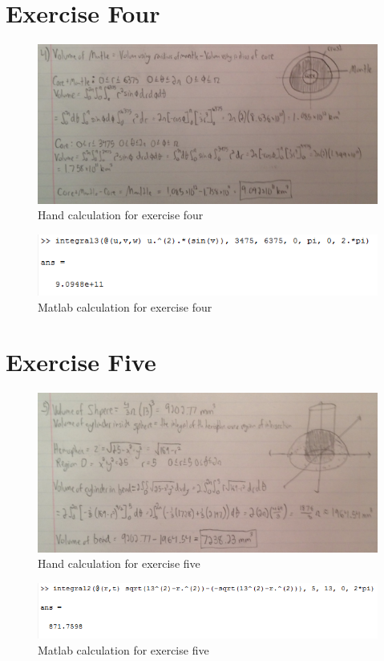 \documentclass[11pt]{article}
\begin{document}
\section*{Exercise Four}
\begin{figure}[H]
	\includegraphics[width=\textwidth]{Four_Hand}
	\caption{Hand calculation for exercise four}
\end{figure}
\begin{figure}[H]
	\includegraphics[width=\textwidth]{Four_Mat.PNG}
	\caption{Matlab calculation for exercise four}
\end{figure}

\section*{Exercise Five}
\begin{figure}[H]
	\includegraphics[width=\textwidth]{Five_Hand}
	\caption{Hand calculation for exercise five}
\end{figure}
\begin{figure}[H]
	\includegraphics[width=\textwidth]{Five_Mat.PNG}
	\caption{Matlab calculation for exercise five}
\end{figure}
\end{document}
